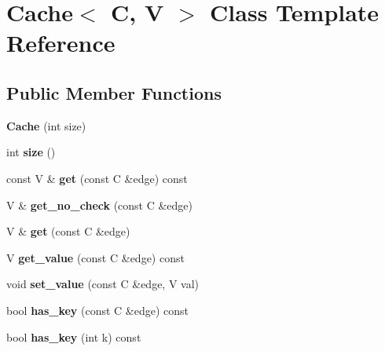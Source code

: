 \hypertarget{classCache}{
\section{Cache$<$ C, V $>$ Class Template Reference}
\label{classCache}
}
\subsection*{Public Member Functions}
\begin{DoxyCompactItemize}
\item 
\hypertarget{classCache_ace98594381db6cd76b3228a73b18190a}{
{\bfseries Cache} (int size)}
\label{classCache_ace98594381db6cd76b3228a73b18190a}

\item 
\hypertarget{classCache_ad0a38f45b45b59a772d1e1fd92e59973}{
int {\bfseries size} ()}
\label{classCache_ad0a38f45b45b59a772d1e1fd92e59973}

\item 
\hypertarget{classCache_a8d126a64723abe79878befff1c622145}{
const V \& {\bfseries get} (const C \&edge) const }
\label{classCache_a8d126a64723abe79878befff1c622145}

\item 
\hypertarget{classCache_a2616bfc563def72da44f91977552ca62}{
V \& {\bfseries get\_\-no\_\-check} (const C \&edge)}
\label{classCache_a2616bfc563def72da44f91977552ca62}

\item 
\hypertarget{classCache_a9256aebb417928fbea6090f820d0652d}{
V \& {\bfseries get} (const C \&edge)}
\label{classCache_a9256aebb417928fbea6090f820d0652d}

\item 
\hypertarget{classCache_a509df0fde9598a4df9879b5ddb9d93d9}{
V {\bfseries get\_\-value} (const C \&edge) const }
\label{classCache_a509df0fde9598a4df9879b5ddb9d93d9}

\item 
\hypertarget{classCache_aeb9ab922add6cf79e2bef1b714f57e8a}{
void {\bfseries set\_\-value} (const C \&edge, V val)}
\label{classCache_aeb9ab922add6cf79e2bef1b714f57e8a}

\item 
\hypertarget{classCache_a0864be6a32d0840a4c3009f9ae417902}{
bool {\bfseries has\_\-key} (const C \&edge) const }
\label{classCache_a0864be6a32d0840a4c3009f9ae417902}

\item 
\hypertarget{classCache_a213273226c6bb403d33e10e2bc769fe1}{
bool {\bfseries has\_\-key} (int k) const }
\label{classCache_a213273226c6bb403d33e10e2bc769fe1}

\end{DoxyCompactItemize}
